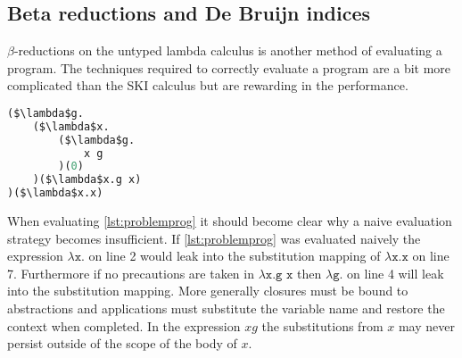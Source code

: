 \documentclass[11pt,oneside,a4paper]{report}
\begin{document}
\subsection{Beta reductions and De Bruijn indices}
$\beta$-reductions on the untyped lambda calculus is another method of evaluating a program.
The techniques required to correctly evaluate a program are a bit more complicated than the SKI calculus but are rewarding in the performance.
\begin{lstlisting}[language=ML,caption={Problematic program},label={lst:problemprog},mathescape=true]
($\lambda$g.
    ($\lambda$x.
        ($\lambda$g.
            x g
        )(0)
    )($\lambda$x.g x)
)($\lambda$x.x)
\end{lstlisting}
When evaluating \autoref{lst:problemprog} it should become clear why a naive evaluation strategy becomes insufficient.
If \autoref{lst:problemprog} was evaluated naively the expression $\lambda\texttt{x.}$ on line 2 would leak into the substitution mapping of $\lambda\texttt{x.x}$ on line 7.
Furthermore if no precautions are taken in $\lambda\texttt{x.g x}$ then $\lambda\texttt{g.}$ on line 4 will leak into the substitution mapping. 
More generally closures must be bound to abstractions and applications must substitute the variable name and restore the context when completed.
In the expression $x g$ the substitutions from $x$ may never persist outside of the scope of the body of $x$.
\end{document}
